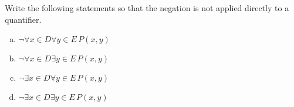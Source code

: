 \guard



\begin{exercise}
\label{exercise:negationOfMixedQuantifierStatements}
  Write the following statements so that the negation is not applied directly to a quantifier.
  \begin{enumerate}[(a)]
    \item $\neg\forall x\in D\forall y\in E\,P(x,y)$
    \item $\neg\forall x\in D\exists y\in E\,P(x,y)$
		\item $\neg\exists x\in D\forall y\in E\,P(x,y)$
    \item $\neg\exists x\in D\exists y\in E\,P(x,y)$
  \end{enumerate}
\end{exercise}
